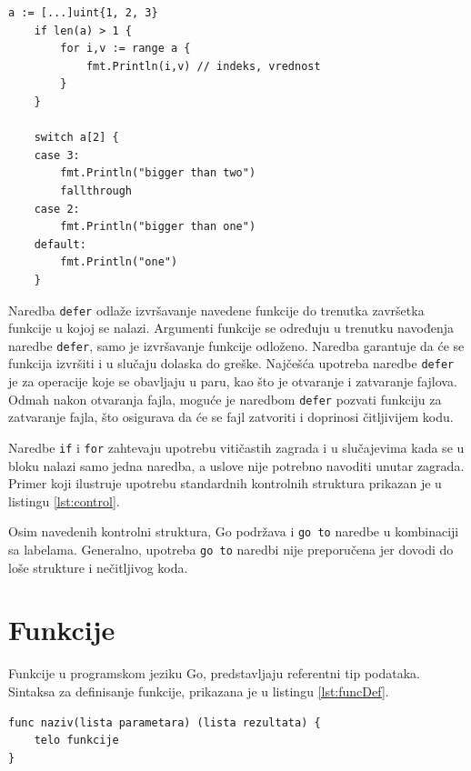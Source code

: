 \documentclass[12pt,oneside]{memoir}
\begin{document}
\begin{center}
\begin{lstlisting}[caption=Primer koji demonstrira upotrebu kontrolnih struktura, label={lst:control},  backgroundcolor=\color{background}]
	a := [...]uint{1, 2, 3}
	if len(a) > 1 {
		for i,v := range a {	
			fmt.Println(i,v) // indeks, vrednost
		}
	}

	switch a[2] {
    case 3:
        fmt.Println("bigger than two")
		fallthrough
    case 2:
        fmt.Println("bigger than one")
    default:
        fmt.Println("one")
    }
\end{lstlisting}
\end{center}

Naredba \texttt{defer} odlaže izvršavanje navedene funkcije do trenutka završetka funkcije u kojoj se nalazi. Argumenti funkcije se određuju u trenutku navođenja naredbe \texttt{defer}, samo je izvršavanje funkcije odloženo. Naredba garantuje da će se funkcija izvršiti i u slučaju dolaska do greške. Najčešća upotreba naredbe \texttt{defer} je za operacije koje se obavljaju u paru, kao što je otvaranje i zatvaranje fajlova. Odmah nakon otvaranja fajla, moguće je naredbom \texttt{defer} pozvati funkciju za zatvaranje fajla, što osigurava da će se fajl zatvoriti i doprinosi čitljivijem kodu. 

Naredbe \texttt{if} i \texttt{for} zahtevaju upotrebu vitičastih zagrada i u slučajevima kada se u bloku nalazi samo jedna naredba, a uslove nije potrebno navoditi unutar zagrada. Primer koji ilustruje upotrebu standardnih kontrolnih struktura prikazan je u listingu \ref{lst:control}. 

Osim navedenih kontrolni struktura, Go podržava i \texttt{go to} naredbe u kombinaciji sa labelama. Generalno, upotreba \texttt{go to} naredbi nije preporučena jer dovodi do loše strukture i nečitljivog koda.


\section{Funkcije} \label{func}

Funkcije u programskom jeziku Go, predstavljaju referentni tip podataka. Sintaksa za definisanje funkcije, prikazana je u listingu \ref{lst:funcDef}.

\begin{center}
\begin{lstlisting}[caption=Sintaksa za definisanje funkcije, label={lst:funcDef},  backgroundcolor=\color{background}]
func naziv(lista parametara) (lista rezultata) {
	telo funkcije 
} 
\end{lstlisting}
\end{center}
\end{document}
